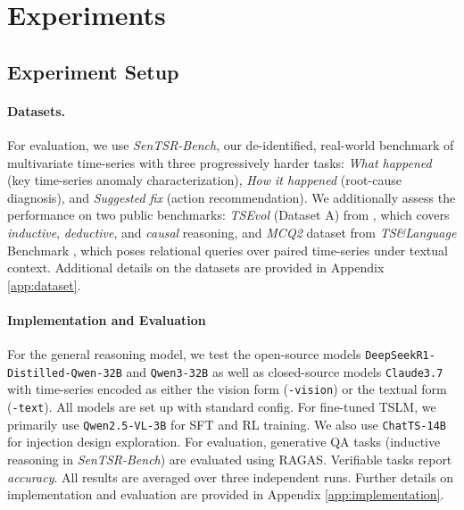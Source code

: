 \documentclass[twoside]{article}
\begin{document}
\section{Experiments}

\subsection{Experiment Setup}
\paragraph{Datasets.}
For evaluation, we use \textit{SenTSR-Bench}, our de-identified, real-world benchmark of multivariate time-series with three progressively harder tasks: \emph{What happened} (key time-series anomaly characterization), \emph{How it happened} (root-cause diagnosis), and \emph{Suggested fix} (action recommendation). We additionally assess the performance on two public benchmarks: \textit{TSEvol} (Dataset A) from \cite{xie2024chatts}, which covers \emph{inductive}, \emph{deductive}, and \emph{causal} reasoning, and \emph{MCQ2} dataset from \textit{TS\&Language} Benchmark \citep{merrill2024language}, which poses relational queries over paired time-series under textual context. Additional details on the datasets are provided in Appendix \ref{app:dataset}.

\paragraph{Implementation and Evaluation} For the general reasoning model, we test the open-source models \texttt{DeepSeekR1-}\texttt{Distilled-}\texttt{Qwen‐32B} \citep{guo2025deepseek} and \texttt{Qwen3-32B} \citep{yang2025qwen3} as well as closed-source models \texttt{Claude3.7} \citep{anthropic2025claude37sonnet} with time-series encoded as either the vision form (\texttt{-vision}) or the textual form (\texttt{-text}). All models are set up with standard config. For fine-tuned TSLM, we primarily use \texttt{Qwen2.5-VL-3B} \citep{bai2025qwen25vl} for SFT and RL training. We also use \texttt{ChatTS-14B} \citep{xie2024chatts} for injection design exploration. For evaluation, generative QA tasks (inductive reasoning in \textit{SenTSR-Bench}) are evaluated using RAGAS. Verifiable tasks report \emph{accuracy}.  All results are averaged over three independent runs. Further details on implementation and evaluation are provided in Appendix \ref{app:implementation}. 
\end{document}
